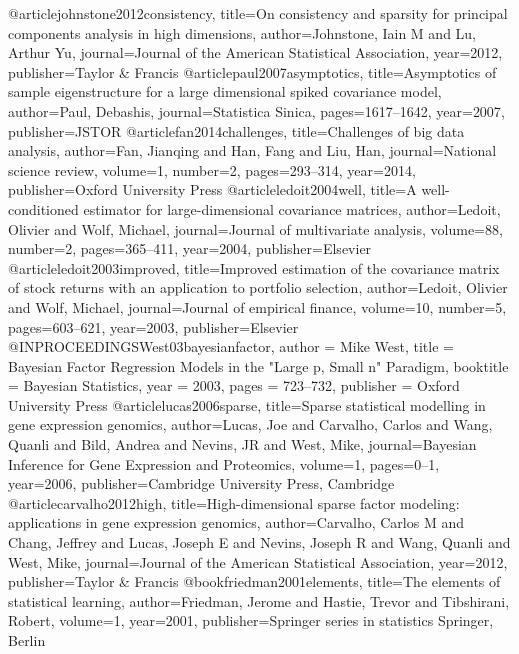 @article{johnstone2012consistency,
  title={On consistency and sparsity for principal components analysis in high dimensions},
  author={Johnstone, Iain M and Lu, Arthur Yu},
  journal={Journal of the American Statistical Association},
  year={2012},
  publisher={Taylor \& Francis}
}
@article{paul2007asymptotics,
  title={Asymptotics of sample eigenstructure for a large dimensional spiked covariance model},
  author={Paul, Debashis},
  journal={Statistica Sinica},
  pages={1617--1642},
  year={2007},
  publisher={JSTOR}
}
@article{fan2014challenges,
  title={Challenges of big data analysis},
  author={Fan, Jianqing and Han, Fang and Liu, Han},
  journal={National science review},
  volume={1},
  number={2},
  pages={293--314},
  year={2014},
  publisher={Oxford University Press}
}
@article{ledoit2004well,
  title={A well-conditioned estimator for large-dimensional covariance matrices},
  author={Ledoit, Olivier and Wolf, Michael},
  journal={Journal of multivariate analysis},
  volume={88},
  number={2},
  pages={365--411},
  year={2004},
  publisher={Elsevier}
}
@article{ledoit2003improved,
  title={Improved estimation of the covariance matrix of stock returns with an application to portfolio selection},
  author={Ledoit, Olivier and Wolf, Michael},
  journal={Journal of empirical finance},
  volume={10},
  number={5},
  pages={603--621},
  year={2003},
  publisher={Elsevier}
}
@INPROCEEDINGS{West03bayesianfactor,
    author = {Mike West},
    title = {Bayesian Factor Regression Models in the "Large p, Small n" Paradigm},
    booktitle = {Bayesian Statistics},
    year = {2003},
    pages = {723--732},
    publisher = {Oxford University Press}
}
@article{lucas2006sparse,
  title={Sparse statistical modelling in gene expression genomics},
  author={Lucas, Joe and Carvalho, Carlos and Wang, Quanli and Bild, Andrea and Nevins, JR and West, Mike},
  journal={Bayesian Inference for Gene Expression and Proteomics},
  volume={1},
  pages={0--1},
  year={2006},
  publisher={Cambridge University Press, Cambridge}
}
@article{carvalho2012high,
  title={High-dimensional sparse factor modeling: applications in gene expression genomics},
  author={Carvalho, Carlos M and Chang, Jeffrey and Lucas, Joseph E and Nevins, Joseph R and Wang, Quanli and West, Mike},
  journal={Journal of the American Statistical Association},
  year={2012},
  publisher={Taylor \& Francis}
}
@book{friedman2001elements,
  title={The elements of statistical learning},
  author={Friedman, Jerome and Hastie, Trevor and Tibshirani, Robert},
  volume={1},
  year={2001},
  publisher={Springer series in statistics Springer, Berlin}
}
